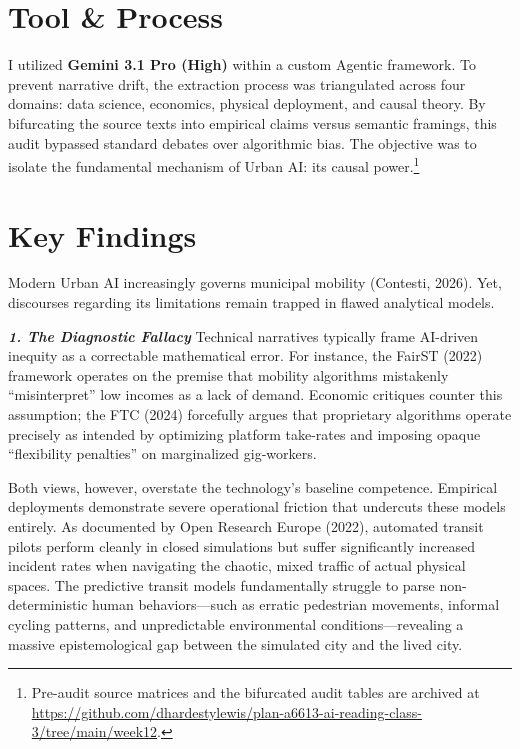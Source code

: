 \documentclass[11pt, twocolumn]{article}
\begin{document}

\section*{Tool \& Process}
I utilized \textbf{Gemini 3.1 Pro (High)} within a custom Agentic framework. To prevent narrative drift, the extraction process was triangulated across four domains: data science, economics, physical deployment, and causal theory. By bifurcating the source texts into empirical claims versus semantic framings, this audit bypassed standard debates over algorithmic bias. The objective was to isolate the fundamental mechanism of Urban AI: its causal power.\footnote{Pre-audit source matrices and the bifurcated audit tables are archived at \url{https://github.com/dhardestylewis/plan-a6613-ai-reading-class-3/tree/main/week12}.} 

\section*{Key Findings}
\noindent Modern Urban AI increasingly governs municipal mobility (Contesti, 2026). Yet, discourses regarding its limitations remain trapped in flawed analytical models.

\textbf{\textit{1. The Diagnostic Fallacy}}
Technical narratives typically frame AI-driven inequity as a correctable mathematical error. For instance, the FairST (2022) framework operates on the premise that mobility algorithms mistakenly ``misinterpret'' low incomes as a lack of demand. Economic critiques counter this assumption; the FTC (2024) forcefully argues that proprietary algorithms operate precisely as intended by optimizing platform take-rates and imposing opaque ``flexibility penalties'' on marginalized gig-workers. 

Both views, however, overstate the technology's baseline competence. Empirical deployments demonstrate severe operational friction that undercuts these models entirely. As documented by Open Research Europe (2022), automated transit pilots perform cleanly in closed simulations but suffer significantly increased incident rates when navigating the chaotic, mixed traffic of actual physical spaces. The predictive transit models fundamentally struggle to parse non-deterministic human behaviors---such as erratic pedestrian movements, informal cycling patterns, and unpredictable environmental conditions---revealing a massive epistemological gap between the simulated city and the lived city.
\end{document}
